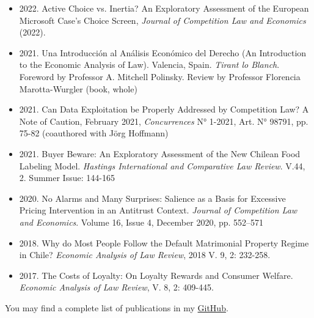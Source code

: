 

\begin{cvparagraph}

\begin{itemize}
\item  2022. Active Choice vs. Inertia? An Exploratory Assessment of the European Microsoft Case’s Choice Screen, \textit{Journal of Competition Law and Economics}  (2022).
\item 2021. Una Introducción al Análisis Económico del Derecho (An Introduction to the Economic Analysis of Law). Valencia, Spain. \textit{Tirant lo Blanch}. Foreword by Professor A. Mitchell Polinsky. Review by Professor Florencia Marotta-Wurgler (book, whole)
\item 2021. Can Data Exploitation be Properly Addressed by Competition Law? A Note of Caution, February 2021, \textit{Concurrences} N° 1-2021, Art. N° 98791, pp. 75-82 (coauthored with Jörg Hoffmann)
\item 2021. Buyer Beware: An Exploratory Assessment of the New Chilean Food Labeling Model. \textit{Hastings International and Comparative Law Review}. V.44, 2. Summer Issue: 144-165
\end{itemize}
\begin{itemize}
\item 2020. No Alarms and Many Surprises: Salience as a Basis for Excessive Pricing Intervention in an Antitrust Context. \textit{Journal of Competition Law and Economics}. Volume 16, Issue 4, December 2020, pp. 552–571
\item  2018. Why do Most People Follow the Default Matrimonial Property Regime in Chile? \textit{Economic Analysis of Law Review}, 2018 V. 9, 2: 232-258. 
\item 2017. The Costs of Loyalty: On Loyalty Rewards and Consumer Welfare. \textit{Economic Analysis of Law Review}, V. 8, 2: 409-445. 
\end{itemize}
You may find a complete list of publications in my \href{https://omarvd.github.io}{GitHub}. 



\end{cvparagraph}




